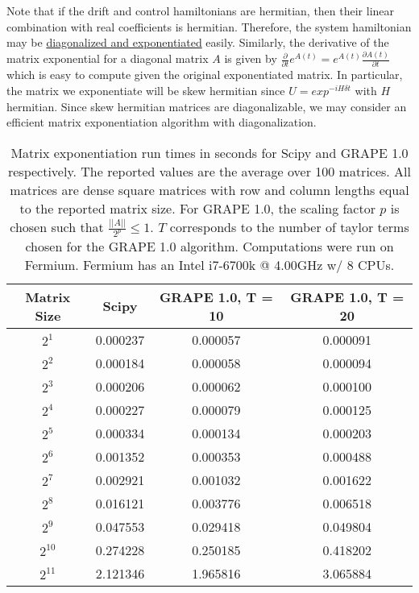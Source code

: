 \documentclass[letterpaper, 12pt]{article}
\begin{document}
Note that if the drift and control hamiltonians are hermitian, then their linear combination with real coefficients is hermitian. Therefore, the system hamiltonian may be \href{https://en.wikipedia.org/wiki/Matrix_exponential#Computing_the_matrix_exponential}{diagonalized and exponentiated} easily. Similarly, the derivative of the matrix exponential for a diagonal matrix $A$ is given by $\frac{\partial}{\partial t} e^{A(t)} = e^{A(t)} \frac{\partial A(t)}{\partial t}$ which is easy to compute given the original exponentiated matrix. In particular, the matrix we exponentiate will be skew hermitian since $U = exp^{-i H \delta t}$ with $H$ hermitian. Since skew hermitian matrices are diagonalizable, we may consider an efficient matrix exponentiation algorithm with diagonalization.
\begin{table}
  \begin{center}
    \begin{tabular}{c | c | c | c}
      Matrix Size & Scipy & GRAPE 1.0, T = 10 & GRAPE 1.0, T = 20\\
      \hline
      $2^{1}$  & 0.000237 & 0.000057 & 0.000091\\
      $2^{2}$  & 0.000184 & 0.000058 & 0.000094\\
      $2^{3}$  & 0.000206 & 0.000062 & 0.000100\\
      $2^{4}$  & 0.000227 & 0.000079 & 0.000125\\
      $2^{5}$  & 0.000334 & 0.000134 & 0.000203\\
      $2^{6}$  & 0.001352 & 0.000353 & 0.000488\\
      $2^{7}$  & 0.002921 & 0.001032 & 0.001622\\
      $2^{8}$  & 0.016121 & 0.003776 & 0.006518\\
      $2^{9}$  & 0.047553 & 0.029418 & 0.049804\\
      $2^{10}$ & 0.274228 & 0.250185 & 0.418202\\
      $2^{11}$ & 2.121346 & 1.965816 & 3.065884\\
    \end{tabular}
  \end{center}
  \caption{Matrix exponentiation run times in seconds for Scipy and GRAPE 1.0 respectively. The reported values are the average over 100 matrices. All matrices are dense square matrices with row and column lengths equal to the reported matrix size. For GRAPE 1.0, the scaling factor $p$ is chosen such that $\frac{||A||}{2^{p}} \le 1$. $T$ corresponds to the number of taylor terms chosen for the GRAPE 1.0 algorithm. Computations were run on Fermium. Fermium has an Intel i7-6700k @ 4.00GHz w/ 8 CPUs.}
\end{table}
\end{document}
